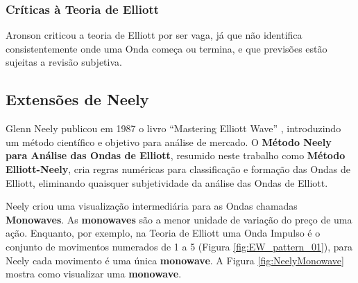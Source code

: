 \documentclass[12pt]{article}
\begin{document}
\subsubsection{Críticas à Teoria de Elliott}


Aronson \cite{Aroson:2006} criticou a teoria de Elliott por ser vaga, já que
não identifica consistentemente onde uma Onda começa ou termina, e que previsões estão
sujeitas a revisão subjetiva.

\subsection{Extensões de Neely} \label{sec:Neely-Extensions}

Glenn Neely publicou em 1987 o livro ``Mastering Elliott Wave'' \cite{Neely:1990},
introduzindo um método científico e objetivo para análise de mercado.
O \textbf{Método Neely para Análise das Ondas de Elliott}, resumido neste trabalho como
\textbf{Método Elliott-Neely}, cria regras numéricas para classificação e formação das
Ondas de Elliott, eliminando quaisquer subjetividade da análise das Ondas de Elliott.

Neely criou uma visualização intermediária para as Ondas chamadas \textbf{Monowaves}.
As \textbf{monowaves} são a menor unidade de variação do preço de uma ação. Enquanto,
por exemplo, na Teoria de Elliott uma Onda Impulso é o conjunto de movimentos numerados de
1 a 5 (Figura \ref{fig:EW_pattern_01}), para Neely cada movimento é uma única
\textbf{monowave}. A Figura \ref{fig:NeelyMonowave} mostra como visualizar uma
\textbf{monowave}.
\end{document}
